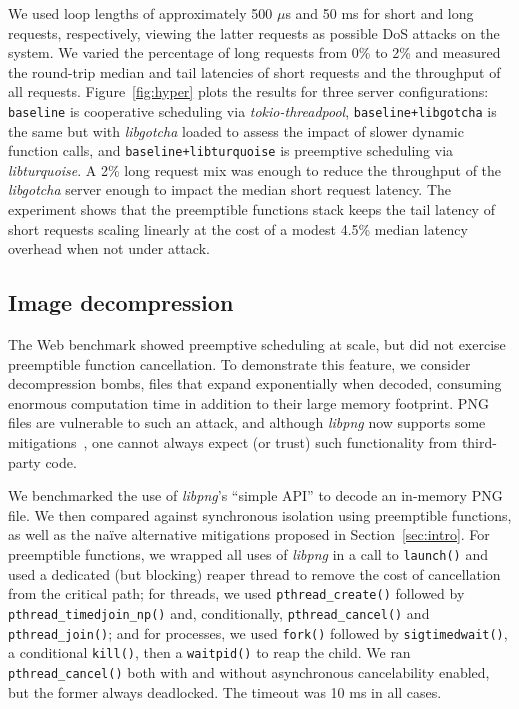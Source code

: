 We used loop lengths of approximately 500 $\mu$s and 50 ms for short and long requests,
respectively, viewing the latter requests as possible DoS attacks on the system.
We varied the percentage of long requests from 0\% to 2\% and measured the round-trip
median and tail latencies of short requests and the throughput of all requests.
Figure~\ref{fig:hyper} plots the results for three server configurations:\@
\texttt{baseline} is cooperative scheduling via \textit{tokio-threadpool},
\texttt{baseline+libgotcha} is the same but with \textit{libgotcha} loaded to assess
the
impact of slower dynamic function calls, and \texttt{baseline+libturquoise} is
preemptive
scheduling via \textit{libturquoise}.  A 2\% long request mix was enough to reduce
the throughput of the \textit{libgotcha} server enough to impact the
median short request latency.
The experiment shows that the preemptible
functions stack keeps the tail latency of short requests scaling linearly at the cost
of a
modest 4.5\% median latency overhead when not under attack.



\subsection{Image decompression}

The Web benchmark showed preemptive scheduling at scale, but did not exercise
preemptible function cancellation.  To demonstrate this feature, we consider
decompression bombs, files that expand exponentially when decoded, consuming enormous
computation time in addition to their large memory footprint.
PNG files are vulnerable to such an attack, and although \textit{libpng} now
supports some mitigations~\cite{www-libpng-bombs}, one cannot always expect (or
trust) such functionality from third-party code.

We benchmarked the use of \textit{libpng}'s ``simple API'' to decode an in-memory PNG
file.  We then compared against synchronous isolation using preemptible functions, as
well as the na\"ive alternative mitigations proposed in Section~\ref{sec:intro}.  For
preemptible functions, we wrapped all uses of \textit{libpng} in a call to
\texttt{launch()} and used a dedicated (but blocking) reaper thread to remove the
cost of cancellation from the critical path; for threads, we used
\texttt{pthread\_create()} followed by \texttt{pthread\_timedjoin\_np()} and,
conditionally, \texttt{pthread\_cancel()} and \texttt{pthread\_join()}; and for
processes, we used \texttt{fork()} followed by \texttt{sigtimedwait()}, a
conditional \texttt{kill()}, then a \texttt{waitpid()} to reap the child.  We ran
\texttt{pthread\_cancel()} both with and without asynchronous cancelability enabled,
but the former always deadlocked.  The timeout was 10 ms in all cases.

